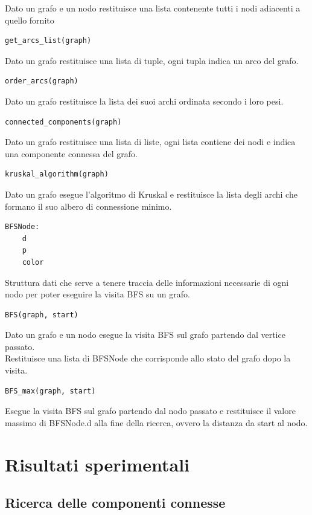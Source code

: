 \documentclass[]{article}
\begin{document}
Dato un grafo e un nodo restituisce una lista contenente tutti i nodi adiacenti a quello fornito\\
\begin{verbatim}
get_arcs_list(graph)
\end{verbatim}
Dato un grafo restituisce una lista di tuple, ogni tupla indica un arco del grafo.\\
\begin{verbatim}
order_arcs(graph)
\end{verbatim}
Dato un grafo restituisce la lista dei suoi archi ordinata secondo i loro pesi.\\
\begin{verbatim}
connected_components(graph)
\end{verbatim}
Dato un grafo restituisce una lista di liste, ogni lista contiene dei nodi e indica una componente connessa del grafo.\\
\begin{verbatim}
kruskal_algorithm(graph)
\end{verbatim}
Dato un grafo esegue l'algoritmo di Kruskal e restituisce la lista degli archi che formano il suo albero di connessione minimo.\\
\begin{verbatim}
BFSNode:
	d
	p
	color
\end{verbatim}
Struttura dati che serve a tenere traccia delle informazioni necessarie di ogni nodo per poter eseguire la visita BFS su un grafo.\\
\begin{verbatim}
BFS(graph, start)
\end{verbatim}
Dato un grafo e un nodo esegue la visita BFS sul grafo partendo dal vertice passato.\\
Restituisce una lista di BFSNode che corrisponde allo stato del grafo dopo la visita.\\
\begin{verbatim}
BFS_max(graph, start)
\end{verbatim}
Esegue la visita BFS sul grafo partendo dal nodo passato e restituisce il valore massimo di BFSNode.d alla fine della ricerca, ovvero la distanza da start al nodo.\\
\newpage
\section{Risultati sperimentali}
\subsection{Ricerca delle componenti connesse}
\end{document}
